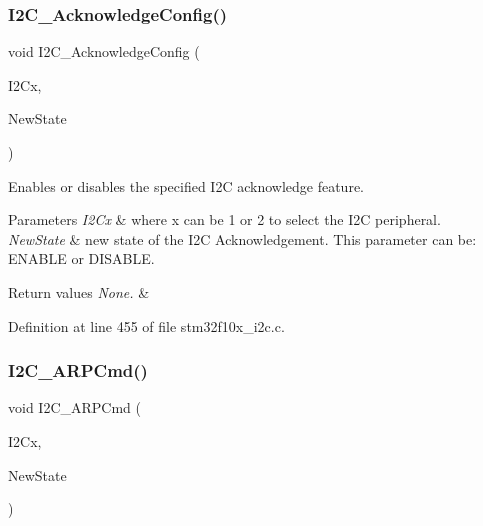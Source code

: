 \subsubsection{\texorpdfstring{I2\+C\+\_\+\+Acknowledge\+Config()}{I2C\_AcknowledgeConfig()}}
{\footnotesize\ttfamily void I2\+C\+\_\+\+Acknowledge\+Config (\begin{DoxyParamCaption}\item[{\hyperlink{struct_i2_c___type_def}{I2\+C\+\_\+\+Type\+Def} $\ast$}]{I2\+Cx,  }\item[{\hyperlink{group___exported__types_gac9a7e9a35d2513ec15c3b537aaa4fba1}{Functional\+State}}]{New\+State }\end{DoxyParamCaption})}



Enables or disables the specified I2C acknowledge feature. 


\begin{DoxyParams}{Parameters}
{\em I2\+Cx} & where x can be 1 or 2 to select the I2C peripheral. \\
\hline
{\em New\+State} & new state of the I2C Acknowledgement. This parameter can be\+: E\+N\+A\+B\+LE or D\+I\+S\+A\+B\+LE. \\
\hline
\end{DoxyParams}

\begin{DoxyRetVals}{Return values}
{\em None.} & \\
\hline
\end{DoxyRetVals}


Definition at line 455 of file stm32f10x\+\_\+i2c.\+c.

\mbox{\label{group___i2_c___private___functions_ga66d86742bf1be58b17ef8779ffc79d02}} 
\subsubsection{\texorpdfstring{I2\+C\+\_\+\+A\+R\+P\+Cmd()}{I2C\_ARPCmd()}}
{\footnotesize\ttfamily void I2\+C\+\_\+\+A\+R\+P\+Cmd (\begin{DoxyParamCaption}\item[{\hyperlink{struct_i2_c___type_def}{I2\+C\+\_\+\+Type\+Def} $\ast$}]{I2\+Cx,  }\item[{\hyperlink{group___exported__types_gac9a7e9a35d2513ec15c3b537aaa4fba1}{Functional\+State}}]{New\+State }\end{DoxyParamCaption})}



